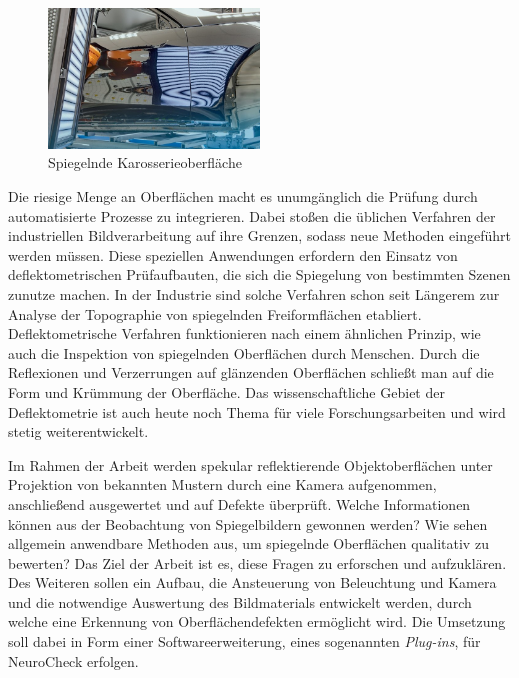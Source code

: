 {
	\begin{figure}[H]
		\centering
		\includegraphics[width=0.5\textwidth]{01_einfuehrung/figures/spiegelndeKarosserie}
		\caption[Spiegelnde Karosserieoberfläche]{Spiegelnde Karosserieoberfläche \cite{spiegelndeKarosserieImg}}
		\label{img:spiegelndeKarosserie}
	\end{figure}
}

\noindent
Die riesige Menge an Oberflächen macht es unumgänglich die Prüfung durch automatisierte Prozesse zu integrieren.
Dabei stoßen die üblichen Verfahren der industriellen Bildverarbeitung auf ihre Grenzen, sodass neue Methoden eingeführt werden müssen.
Diese speziellen Anwendungen erfordern den Einsatz von deflektometrischen Prüfaufbauten, die sich die Spiegelung von bestimmten Szenen zunutze machen.
In der Industrie sind solche Verfahren schon seit Längerem zur Analyse der Topographie von spiegelnden Freiformflächen etabliert.
Deflektometrische Verfahren funktionieren nach einem ähnlichen Prinzip, wie auch die Inspektion von spiegelnden Oberflächen durch Menschen. 
Durch die Reflexionen und Verzerrungen auf glänzenden Oberflächen schließt man auf die Form und Krümmung der Oberfläche.
Das wissenschaftliche Gebiet der Deflektometrie ist auch heute noch Thema für viele Forschungsarbeiten und wird stetig weiterentwickelt.

\p
Im Rahmen der Arbeit werden spekular reflektierende Objektoberflächen unter Projektion von bekannten Mustern durch eine Kamera aufgenommen, anschließend ausgewertet und auf Defekte überprüft.
Welche Informationen können aus der Beobachtung von Spiegelbildern gewonnen werden?
Wie sehen allgemein anwendbare Methoden aus, um spiegelnde Oberflächen qualitativ zu bewerten?
Das Ziel der Arbeit ist es, diese Fragen zu erforschen und aufzuklären.
Des Weiteren sollen ein Aufbau, die Ansteuerung von Beleuchtung und Kamera und die notwendige Auswertung des Bildmaterials entwickelt werden, durch welche eine Erkennung von Oberflächendefekten ermöglicht wird.
Die Umsetzung soll dabei in Form einer Softwareerweiterung, eines sogenannten \textit{Plug-ins}, für NeuroCheck erfolgen.

